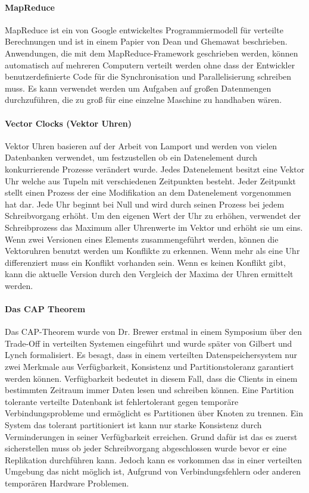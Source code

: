 \paragraph{MapReduce} MapReduce ist ein von Google entwickeltes Programmiermodell für verteilte Berechnungen und ist in einem Papier von Dean und Ghemawat \cite{Dean:2008:MSD:1327452.1327492} beschrieben. Anwendungen, die mit dem MapReduce-Framework geschrieben werden, können automatisch auf mehreren Computern verteilt werden ohne dass der Entwickler benutzerdefinierte Code für die Synchronisation und Parallelisierung schreiben muss. Es kann verwendet werden um Aufgaben auf großen Datenmengen durchzuführen, die zu groß für eine einzelne Maschine zu handhaben wären.

\paragraph{Vector Clocks (Vektor Uhren)}
Vektor Uhren basieren auf der Arbeit von Lamport \cite{Lamport:1978:TCO:359545.359563} und werden von vielen Datenbanken verwendet, um festzustellen ob ein Datenelement durch konkurrierende Prozesse verändert wurde. Jedes Datenelement besitzt eine Vektor Uhr welche aus Tupeln mit verschiedenen Zeitpunkten besteht. Jeder Zeitpunkt stellt einen Prozess der eine Modifikation an dem Datenelement vorgenommen hat dar. Jede Uhr beginnt bei Null und wird durch seinen Prozess bei jedem Schreibvorgang erhöht. Um den eigenen Wert der Uhr zu erhöhen, verwendet der Schreibprozess das Maximum aller Uhrenwerte im Vektor und erhöht sie um eins. Wenn zwei Versionen eines Elements zusammengeführt werden, können die Vektoruhren benutzt werden um Konflikte zu erkennen. Wenn mehr als eine Uhr differenziert muss ein Konflikt vorhanden sein. Wenn es keinen Konflikt gibt, kann die aktuelle Version durch den Vergleich der Maxima der Uhren ermittelt werden.

\paragraph{Das CAP Theorem} Das CAP-Theorem wurde von Dr. Brewer erstmal in einem Symposium \cite{cap2010} über den Trade-Off in verteilten Systemen eingeführt und wurde später von Gilbert und Lynch \cite{Gilbert:2002:BCF:564585.564601} formalisiert. Es besagt, dass in einem verteilten Datenspeichersystem nur zwei Merkmale aus Verfügbarkeit, Konsistenz und  Partitionstoleranz garantiert werden können. Verfügbarkeit bedeutet in diesem Fall, dass die Clients in einem bestimmten Zeitraum immer Daten lesen und schreiben können. Eine Partition tolerante verteilte Datenbank ist fehlertolerant gegen temporäre Verbindungsprobleme und ermöglicht es Partitionen über Knoten zu trennen. Ein System das tolerant partitioniert ist kann nur starke Konsistenz durch Verminderungen in seiner Verfügbarkeit erreichen. Grund dafür ist das es zuerst sicherstellen muss ob jeder Schreibvorgang abgeschlossen wurde bevor er eine Replikation durchführen kann. Jedoch kann es vorkommen das in einer verteilten Umgebung das nicht möglich ist, Aufgrund von Verbindungsfehlern oder anderen temporären Hardware Problemen.

